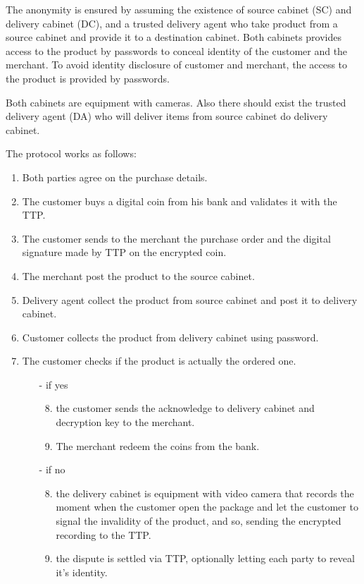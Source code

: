 \documentclass{article}
\begin{document}
The anonymity is ensured by assuming the existence of source cabinet (SC) and delivery cabinet (DC), and a trusted delivery agent who take product from a source cabinet and provide it to a destination cabinet.
Both cabinets provides access to the product by passwords to conceal identity of the customer and the merchant.
To avoid identity disclosure of customer and merchant, the access to the product is provided by passwords.

Both cabinets are equipment with cameras. Also there should exist the trusted delivery agent (DA) who will deliver items from source cabinet do delivery cabinet.

The protocol works as follows:
\begingroup
\renewcommand{\labelenumii}{\arabic{enumii}.}
\begin{enumerate}
\item Both parties agree on the purchase details.
\item The customer buys a digital coin from his bank and validates it with the TTP.
\item The customer sends to the merchant the purchase order and the digital signature made by TTP on the encrypted coin.
\item The merchant post the product to the source cabinet.
\item Delivery agent collect the product from source cabinet and post it to delivery cabinet.
\item Customer collects the product from delivery cabinet using password.
\item The customer checks if the product is actually the ordered one.
\begin{itemize}
\item[-] if yes
\begin{enumerate}
\setcounter{enumii}{7}
\item the customer sends the acknowledge to delivery cabinet and decryption key to the merchant.
\item The merchant redeem the coins from the bank.
\end{enumerate}
\item[-] if no
\begin{enumerate}
\setcounter{enumii}{7}
\item the delivery cabinet is equipment with video camera that records the moment when the customer open the package and let the customer to signal the invalidity of the product, and so, sending the encrypted recording to the TTP.
\item the dispute is settled via TTP, optionally letting each party to reveal it's identity.
\end{enumerate}
\end{itemize}
\end{enumerate}
\endgroup
\end{document}

